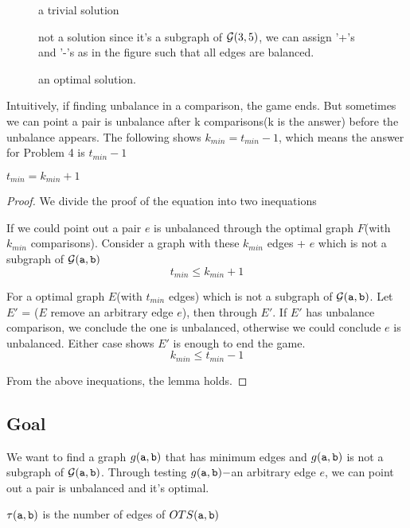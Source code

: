 \begin{figure}[!htb]
    
    \caption{a trivial solution}
  \endminipage\hfill
    
    \caption{not a solution since it's a subgraph of ${\cal G}(3,5)$, we can assign '+'s and '-'s as in the figure such that all edges are balanced.}
  \endminipage\hfill
    
    \caption{an optimal solution.}
  \endminipage
\end{figure}

Intuitively, if finding unbalance in a comparison, the game ends. But sometimes we can point a pair is unbalance after k comparisons(k is the answer) before the unbalance appears. The following shows $k_{min}=t_{min}-1$, which means the answer for Problem 4 is $t_{min}-1$

\begin{lemma}
$t_{min} = k_{min}+1 $
\end{lemma}

\begin{proof}
We divide the proof of the equation into two inequations

If we could point out a pair $e$ is unbalanced through the optimal graph $F$(with $k_{min}$ comparisons).
Consider a graph with these $k_{min}$ edges + $e$ which is not a subgraph of ${\cal G}(\mathtt{a},\mathtt{b})$
\[t_{min}\leq k_{min}+1\]

For a optimal graph $E$(with $t_{min}$ edges) which is not a subgraph of ${\cal G}(\mathtt{a},\mathtt{b})$. Let $E'$ = ($E$ remove an arbitrary edge $e$), then through $E'$. If $E'$ has unbalance comparison, we conclude the one is unbalanced, otherwise we could conclude $e$ is unbalanced.
Either case shows $E'$ is enough to end the game.
\[k_{min} \leq t_{min}-1\]

From the above inequations, the lemma holds.

\end{proof}

\subsection*{Goal}
We want to find a graph $g(\mathtt{a},\mathtt{b})$ that has minimum edges and $g(\mathtt{a},\mathtt{b})$ is not a subgraph of ${\cal G}(\mathtt{a},\mathtt{b})$. Through testing $g(\mathtt{a},\mathtt{b})-$an arbitrary edge $e$, we can point out a pair is unbalanced and it's optimal.

\begin{definition}
$\tau(\mathtt{a},\mathtt{b})$ is the number of edges of $OTS(\mathtt{a},\mathtt{b})$
\end{definition}

